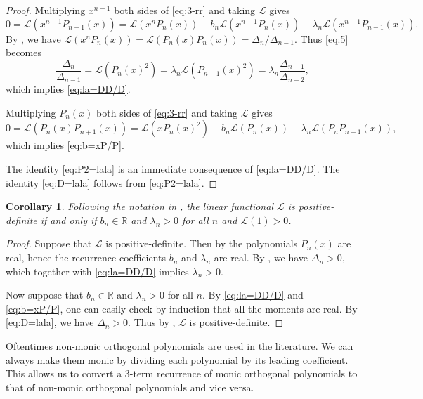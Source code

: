 \documentclass{amsart}
\numberwithin{equation}{section}
\newtheorem{cor}[thm]{Corollary}
\theoremstyle{definition}
\newcommand{\RR}{\mathbb{R}}
\newcommand\LL{\mathcal{L}}
\begin{document}
\begin{proof}
  Multiplying \( x^{n-1} \) both sides of \eqref{eq:3-rr} and taking \( \LL \) gives
  \begin{equation}\label{eq:5}
    0 = \LL(x^{n-1} P_{n+1}(x)) = \LL(x^nP_n(x)) - b_n \LL(x^{n-1}
    P_n(x)) - \lambda_n \LL(x^{n-1}P_{n-1}(x)).
  \end{equation}
  By , we have
  \( \LL(x^n P_n(x)) = \LL(P_n(x) P_n(x)) = \Delta_n/\Delta_{n-1} \).
  Thus \eqref{eq:5} becomes
  \[
    \frac{\Delta_n}{\Delta_{n-1}} = \LL(P_n(x)^2) = \lambda_n \LL(P_{n-1}(x)^2)
     = \lambda_n  \frac{\Delta_{n-1}}{\Delta_{n-2}},
  \]
  which implies \eqref{eq:la=DD/D}. 

  Multiplying \( P_n(x) \) both sides of \eqref{eq:3-rr} and taking
  \( \LL \) gives
  \[
   0= \LL(P_n(x)P_{n+1}(x)) = \LL(xP_n(x)^2)- b_n\LL(P_n(x)) - \lambda_n \LL(P_nP_{n-1}(x)),
  \]
  which implies \eqref{eq:b=xP/P}.

  The identity \eqref{eq:P2=lala} is an immediate consequence of
  \eqref{eq:la=DD/D}. The identity \eqref{eq:D=lala} follows from
  \eqref{eq:P2=lala}.
\end{proof}

\begin{cor}\label{cor:la-pos-def}
  Following the notation in , the linear functional
  \( \LL \) is positive-definite if and only if \( b_n\in \RR \) and
  \( \lambda_n>0 \) for all \( n \) and \( \LL(1)>0 \).
\end{cor}
\begin{proof}
  Suppose that \( \LL \) is positive-definite. Then by
   the polynomials \( P_n(x) \) are real, hence
  the recurrence coefficients \( b_n \) and \( \lambda_n \) are real.
  By , we have \( \Delta_n>0 \), which
  together with \eqref{eq:la=DD/D} implies \( \lambda_n>0 \).

  Now suppose that \( b_n\in \RR \) and \( \lambda_n>0 \) for all
  \( n \). By \eqref{eq:la=DD/D} and \eqref{eq:b=xP/P}, one can easily
  check by induction that all the moments are real. By \eqref{eq:D=lala},
  we have \( \Delta_n>0 \). Thus by ,
  \( \LL \) is positive-definite.
\end{proof}

Oftentimes non-monic orthogonal polynomials are used in the
literature. We can always make them monic by dividing each polynomial
by its leading coefficient. This allows us to convert a 3-term
recurrence of monic orthogonal polynomials to that of non-monic
orthogonal polynomials and vice versa.
\end{document}
